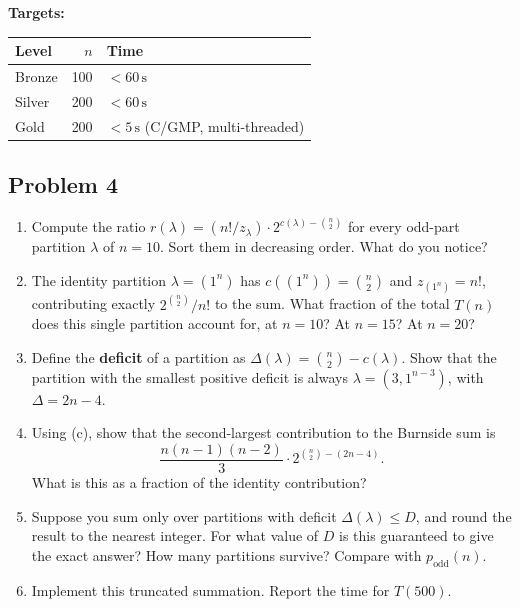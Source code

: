 \documentclass[11pt,letterpaper]{article}
\theoremstyle{definition}
\begin{document}
\medskip\noindent\textbf{Targets:}
\begin{center}
\begin{tabular}{lrl}
\toprule
Level & $n$ & Time \\
\midrule
Bronze & 100 & $< 60\,\mathrm{s}$ \\
Silver & 200 & $< 60\,\mathrm{s}$ \\
Gold & 200 & $< 5\,\mathrm{s}$ (C/GMP, multi-threaded) \\
\bottomrule
\end{tabular}
\end{center}

\bigskip


\subsection*{Problem 4 \hfill \normalfont [35 points]}

\begin{enumerate}[label=(\alph*)]
  \item Compute the ratio $r(\lambda) = (n!/z_\lambda) \cdot 2^{c(\lambda) - \binom{n}{2}}$ for every odd-part partition $\lambda$ of $n = 10$. Sort them in decreasing order. What do you notice?

  \item The identity partition $\lambda = (1^n)$ has $c((1^n)) = \binom{n}{2}$ and $z_{(1^n)} = n!$, contributing exactly $2^{\binom{n}{2}}/n!$ to the sum. What fraction of the total $T(n)$ does this single partition account for, at $n = 10$? At $n = 15$? At $n = 20$?

  \item Define the \textbf{deficit} of a partition as $\Delta(\lambda) = \binom{n}{2} - c(\lambda)$. Show that the partition with the smallest positive deficit is always $\lambda = (3, 1^{n-3})$, with $\Delta = 2n - 4$.

  \item Using (c), show that the second-largest contribution to the Burnside sum is
  \[
  \frac{n(n-1)(n-2)}{3} \cdot 2^{\binom{n}{2} - (2n-4)}.
  \]
  What is this as a fraction of the identity contribution?

  \item Suppose you sum only over partitions with deficit $\Delta(\lambda) \leq D$, and round the result to the nearest integer. For what value of $D$ is this guaranteed to give the exact answer? How many partitions survive? Compare with $p_{\mathrm{odd}}(n)$.

  \item Implement this truncated summation. Report the time for $T(500)$.
\end{enumerate}
\end{document}
